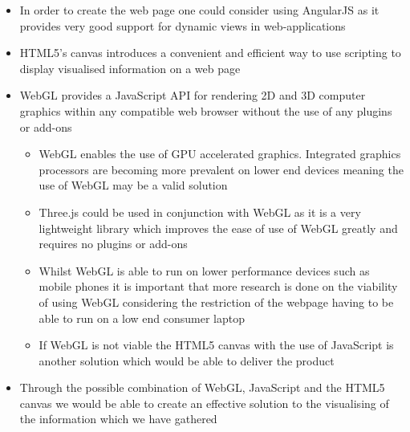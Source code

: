 \documentclass{article}
\begin{document}
\begin{itemize}
			\begin{itemize}
				\item In order to create the web page one could consider using AngularJS as it provides very good support for dynamic views in web-applications
				\item HTML5's canvas introduces a convenient and efficient way to use scripting to display visualised information on a web page
				\item WebGL provides a JavaScript API for rendering 2D and 3D computer graphics within any compatible web browser without the use of any plugins or add-ons
				\begin{itemize}
					\item WebGL enables the use of GPU accelerated graphics. Integrated graphics processors are becoming more prevalent on lower end devices meaning the use of WebGL may be a valid solution
					\item Three.js could be used in conjunction with WebGL as it is a very lightweight library which improves the ease of use of WebGL greatly and requires no plugins or add-ons
					\item Whilst WebGL is able to run on lower performance devices such as mobile phones it is important that more research is done on the viability of using WebGL considering the restriction of the webpage having to be able to run on a low end consumer laptop
					\item If WebGL is not viable the HTML5 canvas with the use of JavaScript is another solution which would be able to deliver the product
				\end{itemize}
				\item Through the possible combination of WebGL, JavaScript and the HTML5 canvas we would be able to create an effective solution to the visualising of the information which we have gathered
			\end{itemize}
		\end{itemize}
\end{document}
